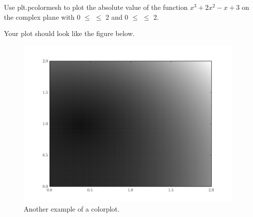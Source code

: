 \begin{problem} Use plt.pcolormesh to plot the absolute value of the function $x^3 +2x^2 -x +3$ on the complex plane with 0 $\leq$  $\leq$ 2 and 0 $\leq$  $\leq$ 2. 

Your plot should look like the figure below.



\begin{figure}[H]
\includegraphics[width=\textwidth]{pcolor2.png}
\caption{Another example of a colorplot.} 
\label{fig:pcolormesh}
\end{figure}
\end{problem}

